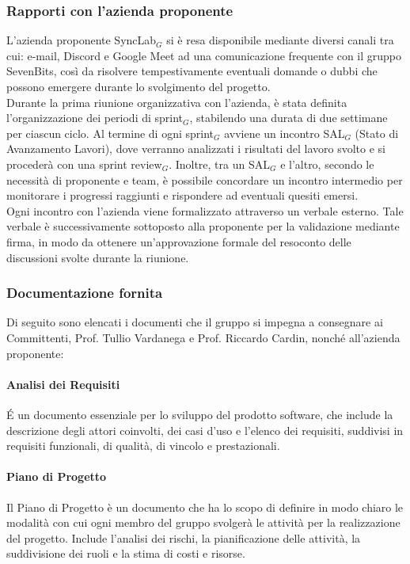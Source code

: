 \subsubsection{Rapporti con l'azienda proponente}
L'azienda proponente SyncLab$_G$ si è resa disponibile mediante diversi canali tra cui: e-mail, Discord e Google Meet ad una comunicazione frequente con il gruppo SevenBits, così da risolvere tempestivamente eventuali domande o dubbi che possono emergere durante lo svolgimento del progetto.\\
Durante la prima riunione organizzativa con l'azienda, è stata definita l'organizzazione dei periodi di sprint$_G$, stabilendo una durata di due settimane per ciascun ciclo. Al termine di ogni sprint$_G$ avviene un incontro SAL$_G$ (Stato di Avanzamento Lavori), dove verranno analizzati i risultati del lavoro svolto e si procederà con una sprint review$_G$. Inoltre, tra un SAL$_G$ e l'altro, secondo le necessità di proponente e team, è possibile concordare un incontro intermedio per monitorare i progressi raggiunti e rispondere ad eventuali quesiti emersi.\\
Ogni incontro con l'azienda viene formalizzato attraverso un verbale esterno. Tale verbale è successivamente sottoposto alla proponente per la validazione mediante firma, in modo da ottenere un'approvazione formale del resoconto delle discussioni svolte durante la riunione.\\

\subsubsection{Documentazione fornita}
Di seguito sono elencati i documenti che il gruppo si impegna a consegnare ai Committenti, Prof. Tullio Vardanega e Prof. Riccardo Cardin, nonché all'azienda proponente:\\

    \paragraph{Analisi dei Requisiti}
    \'E un documento essenziale per lo sviluppo del prodotto software, che include la descrizione degli attori coinvolti, dei casi d’uso e l’elenco dei requisiti, suddivisi in requisiti funzionali, di qualità, di vincolo e prestazionali.\\

    \paragraph{Piano di Progetto}
    Il Piano di Progetto è un documento che ha lo scopo di definire in modo chiaro le modalità con cui ogni membro del gruppo svolgerà le attività per la realizzazione del progetto. Include l'analisi dei rischi, la pianificazione delle attività, la suddivisione dei ruoli e la stima di costi e risorse.\\


